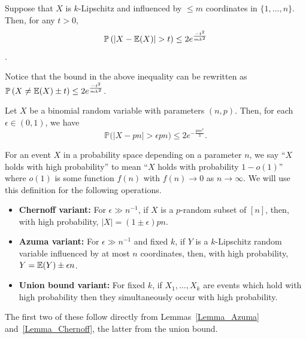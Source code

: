 \begin{lemma}\label{Lemma_Azuma}
Suppose that $X$ is $k$-Lipschitz and influenced by $\leq m$ coordinates in $\{1, \dots, n\}$. Then{, for any $t>0$,}
$$\P\left(|X-\E(X)|>t \right)\leq 2e^{\frac{-t^2}{mk^2}}$$.
\end{lemma}

Notice that the bound in the above inequality can be rewritten as $\mathbb{P}\left(X\neq \mathbb{E}(X)\pm t \right)\leq 2e^{\frac{-t^2}{mk^2}}$.


\begin{lemma} \label{Lemma_Chernoff}
Let $X$ be a binomial random variable with parameters $(n,p)$.
Then, for each $\epsilon\in (0,1)$, we have
$$\mathbb P\big(|X-pn|> \epsilon pn\big)\leq
2e^{-\frac{pn\epsilon^2}{3}}.$$
\end{lemma}


For an event $X$ in a probability space depending on a parameter $n$, we say ``$X$ holds with high probability'' to mean ``$X$ holds with probability $1-o(1)$'' where $o(1)$ is some function $f(n)$ with $f(n)\to 0$ as $n\to \infty$.
We will use this definition for the following operations.
\begin{itemize}
\item \textbf{Chernoff variant:} For $\epsilon \gg n^{-1}$, if $X$ is a $p$-random subset of $[n]$, then, with high probability, $|X|=(1\pm \epsilon)pn$.
\item \textbf{Azuma variant:} For $\epsilon\gg n^{-1}$ and fixed $k$, if $Y$ is a  $k$-Lipschitz random variable influenced by at most $n$ coordinates, then, with high probability, $Y=\mathbb{E}(Y)\pm \epsilon n$.
\item \textbf{Union bound variant:} For fixed $k$, if $X_1, \dots, X_{k}$ are events which hold with high probability then they simultaneously occur with high probability.
\end{itemize}
The first two of these follow directly from Lemmas~\ref{Lemma_Azuma} and~\ref{Lemma_Chernoff}, the latter from the union bound.



